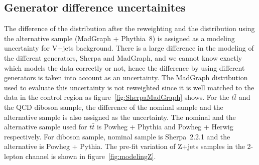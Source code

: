 \subsection{Generator difference uncertainites}
The difference of the distribution after the reweighting and the distribution using the alternative sample (MadGraph + Phythia~8) is assigned as a modeling uncertainty for V+jets background. There is a large difference in the modeling of the different generators, Sherpa and MadGraph, and we cannot know exactly which models the data correctly or not, hence the difference by using different generators is taken into account as an uncertainty. The MadGraph distribution used to evaluate this uncertainty is not reweighted since it is well matched to the data in the control region as figure~\ref{fig:SherpaMadGraph} shows.
For the $t\bar{t}$ and the QCD diboson sample, the difference of the nominal sample and the alternative sample is also assigned as the uncertainty.
The nominal and the alternative sample used for $t\bar{t}$ is Powheg + Phythia and Powheg + Herwig respectively.
For diboson sample, nominal sample is Sherpa~2.2.1 and the alternative is Powheg + Pythia.
The pre-fit variation of Z+jets samples in the 2-lepton channel is shown in figure~\ref{fig:modelingZ}.
